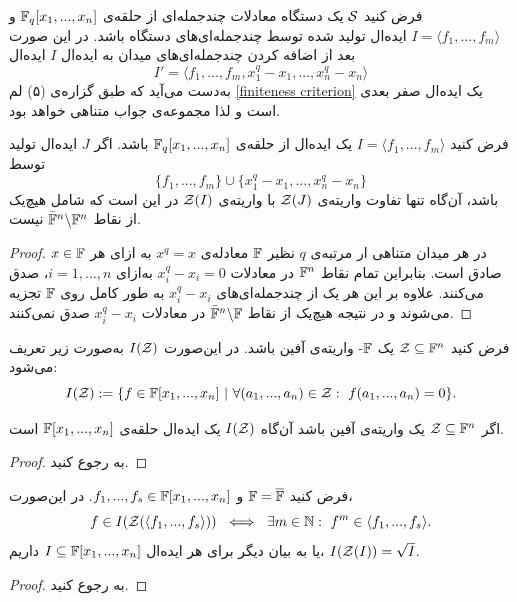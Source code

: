 \begin{corollary}
	فرض کنید 
	${\mathcal S}$
	یک دستگاه معادلات چندجمله‌ای از حلقه‌ی 
	$\mathbb{F}_{q}[x_{1},...,x_{n}]$
	و 
	$I = \langle f_{1},...,f_{m}\rangle$
	ایده‌ال تولید شده توسط چندجمله‌ای‌های دستگاه باشد. در این ‌صورت بعد از اضافه کردن چندجمله‌ای‌های میدان به ایده‌ال
	$I$
	ایده‌ال
	$$I' = \langle f_{1},...,f_{m},x_{1}^{q} - x_{1},...,x_{n}^{q} - x_{n} \rangle$$
	به‌دست  می‌آید که طبق گزاره‌ی (۵) لم 
	\ref{finiteness criterion}
	یک ایده‌ال صفر بعدی است و لذا مجموعه‌ی جواب متناهی خواهد بود.
\end{corollary}

\begin{corollary}
	فرض کنید 
	$I = \langle f_{1},...,f_{m} \rangle$
	یک ایده‌ال از حلقه‌ی 
	$\mathbb{F}_{q}[x_{1},...,x_{n}]$
	باشد. اگر 
	$J$
	ایده‌ال تولید توسط
	$$\{f_{1}, ...,f_{m}\}\cup\{x_{1}^{q} - x_{1},...,x_{n}^{q}- x_{n}\}$$
	باشد، آن‌گاه تنها تفاوت واریته‌ی 
	${\mathcal Z}(J)$
	با واریته‌ی 
	${\mathcal Z}(I)$
	در این است که شامل هیچ‌یک از نقاط 
	$\bar{\mathbb{F}}^{n}\backslash \mathbb{F}^{n}$
	نیست.
\end{corollary}
\begin{proof}
	در هر میدان متناهی ار مرتبه‌ی 
	$q$
	نظیر 
	$\mathbb{F}$
	معادله‌ی 
	$x^{q} = x$
	به ازای هر 
	$x\in \mathbb{F}$
	صادق است. بنابراین تمام نقاط 
	$\mathbb{F}^{n}$
	در معادلات 
	$x_{i}^{q} - x_{i} = 0$
	به‌ازای 
	$i = 1,...,n$،
	صدق می‌کنند. علاوه بر  این هر یک از چندجمله‌ای‌های 
	$x_{i}^{q} - x_{i}$
	به طور کامل روی 
	$\mathbb{F}$
	تجزیه می‌شوند و در نتیجه هیچ‌یک از نقاط 
	$\bar{\mathbb{F}}^{n}\backslash \mathbb{F}$
	در معادلات 
	$x_{i}^{q} - x_{i}$
	صدق نمی‌کنند. 
\end{proof}

\begin{definition}
	فرض کنید 
	${\mathcal Z}\subseteq \mathbb{F}^{n}$
	یک 
	$\mathbb{F}$-
	واریته‌ی آفین باشد. در این‌صورت 
	$I({\mathcal Z})$
	به‌صورت زیر تعریف می‌شود:
	$$I({\mathcal Z}):= \{f\in \mathbb{F}[x_{1},...,x_{n}] \ | \ \forall (a_{1},...,a_{n})\in {\mathcal Z}: \ f(a_{1},...,a_{n}) = 0 \}.$$
\end{definition}

\begin{lemma}
	اگر 
	${\mathcal Z}\subseteq \mathbb{F}^{n}$
	یک واریته‌ی آفین باشد آن‌گاه 
	$I({\mathcal Z})$
	یک ایده‌ال حلقه‌ی
	$\mathbb{F}[x_{1},...,x_{n}]$
	است.
\end{lemma}
\begin{proof}
	به 
	\cite[ص.۳۲]{IVAcox}
	رجوع کنید.
\end{proof}

\begin{theorem}
	فرض کنید 
	$\mathbb{F} = \overline{\mathbb{F}}$
	و 
	$f_{1},...,f_{s}\in \mathbb{F}[x_{1},...,x_{n}]$.
	در این‌صورت،
	$$f\in I({\mathcal Z}(\langle f_{1},...,f_{s} \rangle)) \ \iff \ \exists m\in\mathbb{N} : \ f^{m}\in\langle f_{1},...,f_{s}\rangle.$$
	یا به بیان دیگر برای هر ایده‌ال 
	$I\subseteq\mathbb{F}[x_{1},...,x_{n}]$
	داریم،
	$I({\mathcal Z}(I)) = \sqrt{I}$.
\end{theorem}
\begin{proof}
	به 
	\cite[ص.۱۷۹]{IVAcox}
	رجوع کنید.
\end{proof}



